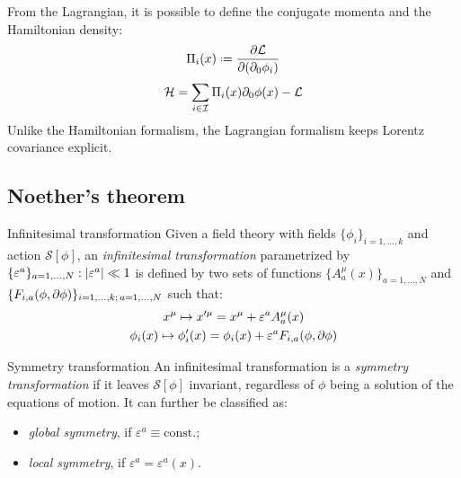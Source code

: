 From the Lagrangian, it is possible to define the conjugate momenta and the Hamiltonian density:
\begin{equation}
  \Pi_i(x) \defeq \frac{\pa \mathcal{L}}{\pa (\pa_0 \phi_i)}
  \label{eq:1.59}
\end{equation}
\begin{equation}
  \mathcal{H} = \sum_{i \in \mathcal{I}} \Pi_i(x) \partial_0 \phi(x) - \mathcal{L}
  \label{eq:1.60}
\end{equation}
Unlike the Hamiltonian formalism, the Lagrangian formalism keeps Lorentz covariance explicit.

\subsection{Noether's theorem}

\begin{definition}{Infinitesimal transformation}{}
  Given a field theory with fields $ \{\phi_i\}_{i = 1, \dots, k} $ and action $ \mathcal{S}[\phi] $, an \textit{infinitesimal transformation} parametrized by $ \{\varepsilon^a\}_{a = 1, \dots, N} : \left\lvert\varepsilon^a\right\rvert \ll 1 $ is defined by two sets of functions $ \{A^\mu_a(x)\}_{a = 1, \dots, N} $ and $ \{F_{i,a}(\phi,\partial \phi)\}_{i = 1, \dots, k ;\, a = 1, \dots, N} $ such that:
  \begin{equation}
    \begin{gathered}
      x^\mu \mapsto x'^\mu = x^\mu + \varepsilon^a A^\mu_a(x) \\
      \phi_i(x) \mapsto \phi'_i(x) = \phi_i(x) + \varepsilon^a F_{i,a}(\phi, \partial \phi)
    \end{gathered}
    \label{eq:1.61}
  \end{equation}
\end{definition}

\begin{definition}{Symmetry transformation}{}
  An infinitesimal transformation is a \textit{symmetry transformation} if it leaves $ \mathcal{S}[\phi] $ invariant, regardless of $ \phi $ being a solution of the equations of motion. It can further be classified as:
  \begin{itemize}
    \item \textit{global symmetry}, if $ \varepsilon^a \equiv \mathrm{const.} $;
    \item \textit{local symmetry}, if $ \varepsilon^a = \varepsilon^a(x) $.
  \end{itemize}
\end{definition}


